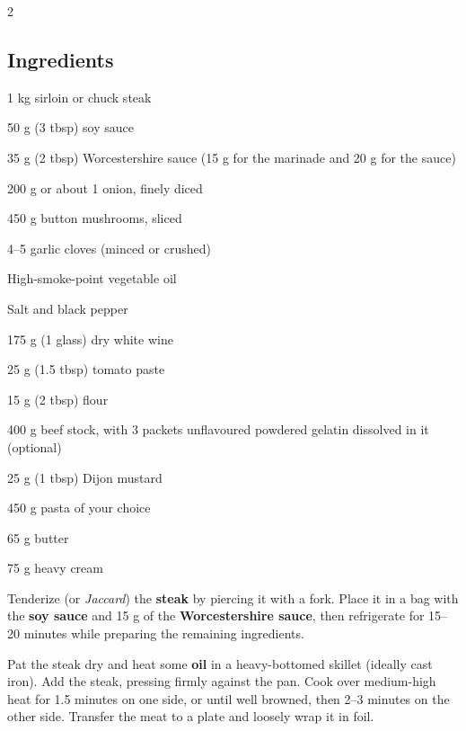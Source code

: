 \newpage
{}
\vspace*{-0.5 cm}
\begin{multicols}{2}
	\subsection*{Ingredients}
	\begin{ingredients}
		\item 1 kg sirloin or chuck steak
		\item 50 g (3 tbsp) soy sauce
		\item 35 g (2 tbsp) Worcestershire sauce (15 g for the marinade and 20 g for the sauce)
		\item 200 g or about 1 onion, finely diced
		\item 450 g button mushrooms, sliced
		\item 4--5 garlic cloves (minced or crushed)
		\item High-smoke-point vegetable oil
		\item Salt and black pepper
		\item 175 g (1 glass) dry white wine
		\item 25 g (1.5 tbsp) tomato paste
		\item 15 g (2 tbsp) flour
		\item 400 g beef stock, with 3 packets unflavoured powdered gelatin dissolved in it (optional)
		\item 25 g (1 tbsp) Dijon mustard
		\item 450 g pasta of your choice
		\item 65 g butter
		\item 75 g heavy cream
	\end{ingredients}
	
\end{multicols}

\vspace*{-0.2cm}

Tenderize (or \textit{Jaccard}) the \textbf{steak} by piercing it with a fork.
Place it in a bag with the \textbf{soy sauce} and 15 g of the \textbf{Worcestershire sauce}, then refrigerate for 15--20 minutes while preparing the remaining ingredients.

Pat the steak dry and heat some \textbf{oil} in a heavy-bottomed skillet (ideally cast iron). 
Add the steak, pressing firmly against the pan.
Cook over medium-high heat for 1.5 minutes on one side, or until well browned, then 2--3 minutes on the other side.
Transfer the meat to a plate and loosely wrap it in foil.

